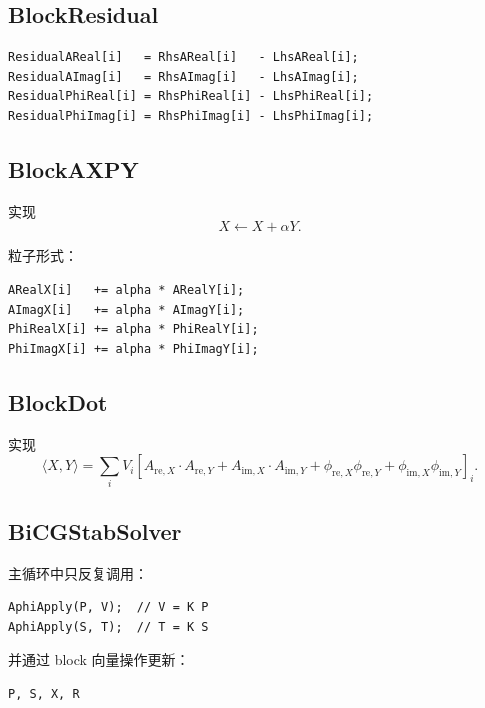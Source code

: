 \documentclass[UTF8,11pt]{ctexart}
\begin{document}
\subsection{BlockResidual}

\begin{lstlisting}
ResidualAReal[i]   = RhsAReal[i]   - LhsAReal[i];
ResidualAImag[i]   = RhsAImag[i]   - LhsAImag[i];
ResidualPhiReal[i] = RhsPhiReal[i] - LhsPhiReal[i];
ResidualPhiImag[i] = RhsPhiImag[i] - LhsPhiImag[i];
\end{lstlisting}

\subsection{BlockAXPY}

实现
\begin{equation}
    X \leftarrow X+\alpha Y.
\end{equation}

粒子形式：
\begin{lstlisting}
ARealX[i]   += alpha * ARealY[i];
AImagX[i]   += alpha * AImagY[i];
PhiRealX[i] += alpha * PhiRealY[i];
PhiImagX[i] += alpha * PhiImagY[i];
\end{lstlisting}

\subsection{BlockDot}

实现
\begin{equation}
    \langle X,Y\rangle
    =
    \sum_i V_i
    \left[
        A_{\mathrm{re},X}\cdot A_{\mathrm{re},Y}
        +
        A_{\mathrm{im},X}\cdot A_{\mathrm{im},Y}
        +
        \phi_{\mathrm{re},X}\phi_{\mathrm{re},Y}
        +
        \phi_{\mathrm{im},X}\phi_{\mathrm{im},Y}
    \right]_i.
\end{equation}

\subsection{BiCGStabSolver}

主循环中只反复调用：
\begin{lstlisting}
AphiApply(P, V);  // V = K P
AphiApply(S, T);  // T = K S
\end{lstlisting}

并通过 block 向量操作更新：
\begin{lstlisting}
P, S, X, R
\end{lstlisting}
\end{document}
